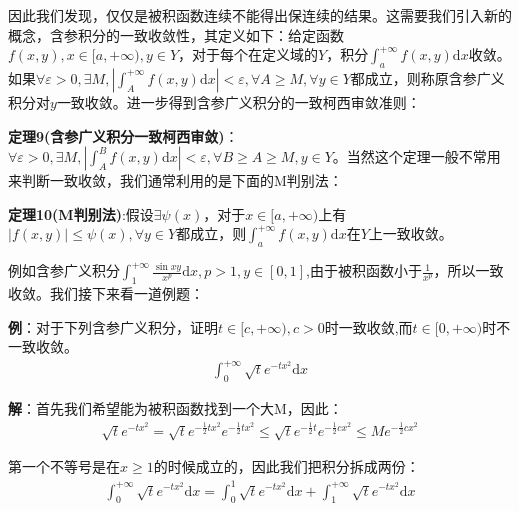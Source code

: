 \documentclass{ctexart}
\let\oldtextbf\textbf
\renewcommand{\textbf}[1]{\textcolor{brown!50!red}{\oldtextbf{#1}}}
\begin{document}
因此我们发现，仅仅是被积函数连续不能得出保连续的结果。这需要我们引入新的概念，含参积分的一致收敛性，其定义如下：给定函数$f(x,y),x\in[a,+\infty),y\in Y$，对于每个在定义域的$Y$，积分$\int_a^{+\infty}f(x,y)\mathrm{d}x$收敛。如果$\forall \varepsilon>0,\exists M,|\int_A^{+\infty}f(x,y)\mathrm{d}x|<\varepsilon,\forall A\geq M,\forall y\in Y$都成立，则称原含参广义积分对$y$一致收敛。进一步得到含参广义积分的一致柯西审敛准则：
\begin{tcolorbox}[
    colback=bac2,     %
    colframe=fra2,   %
    coltitle=white,             %
    coltext=tex2,
    title=含参广义积分一致柯西审敛准则,
    fonttitle=\bfseries,        %
arc=3mm,                     %
breakable
]
\textbf{\color{brown!50!red}定理9(含参广义积分一致柯西审敛)}：$\forall \varepsilon>0,\exists M,|\int_A^B f(x,y)\mathrm{d}x|<\varepsilon,\forall B\geq A\geq M,y\in Y$。当然这个定理一般不常用来判断一致收敛，我们通常利用的是下面的M判别法：
\end{tcolorbox}


\begin{tcolorbox}[
    colback=bac2,     %
    colframe=fra2,   %
    coltitle=white,             %
    coltext=tex2,
    title=M判别法,
    fonttitle=\bfseries,        %
arc=3mm,                     %
breakable
]
\textbf{\color{brown!50!red}定理10(M判别法)}:假设$\exists \psi(x)$，对于$x\in[a,+\infty)$上有$|f(x,y)|\leq \psi(x),\forall y\in Y$都成立，则$\int_a^{+\infty}f(x,y)\mathrm{d}x$在$Y$上一致收敛。
\end{tcolorbox}

例如含参广义积分$\int_1^{+\infty}\frac{\sin xy}{x^p}\mathrm{d}x,p>1,y\in[0,1]$,由于被积函数小于$\frac{1}{x^p}$，所以一致收敛。我们接下来看一道例题：

\textbf{\color{brown!50!red}例}：对于下列含参广义积分，证明$t\in[c,+\infty),c>0$时一致收敛,而$t\in[0,+\infty)$时不一致收敛。
\begin{align*}
    \int_0^{+\infty}\sqrt{t}e^{-tx^2}\mathrm{d}x
\end{align*}

\textbf{\color{brown!50!red}解}：首先我们希望能为被积函数找到一个大M，因此：
\begin{align*}
\sqrt{t}e^{-tx^2}=\sqrt{t}e^{-\frac{1}{2}tx^2}e^{-\frac{1}{2}tx^2}\leq
\sqrt{t}e^{-\frac{1}{2}t}e^{-\frac{1}{2}cx^2}\leq Me^{-\frac{1}{2}cx^2 }
\end{align*}

第一个不等号是在$x\geq 1$的时候成立的，因此我们把积分拆成两份：
\begin{align*}
\int_0^{+\infty}\sqrt{t}e^{-tx^2}\mathrm{d}x=\int_0^{1}\sqrt{t}e^{-tx^2}\mathrm{d}x+\int_1^{+\infty}\sqrt{t}e^{-tx^2}\mathrm{d}x
\end{align*}
\end{document}

